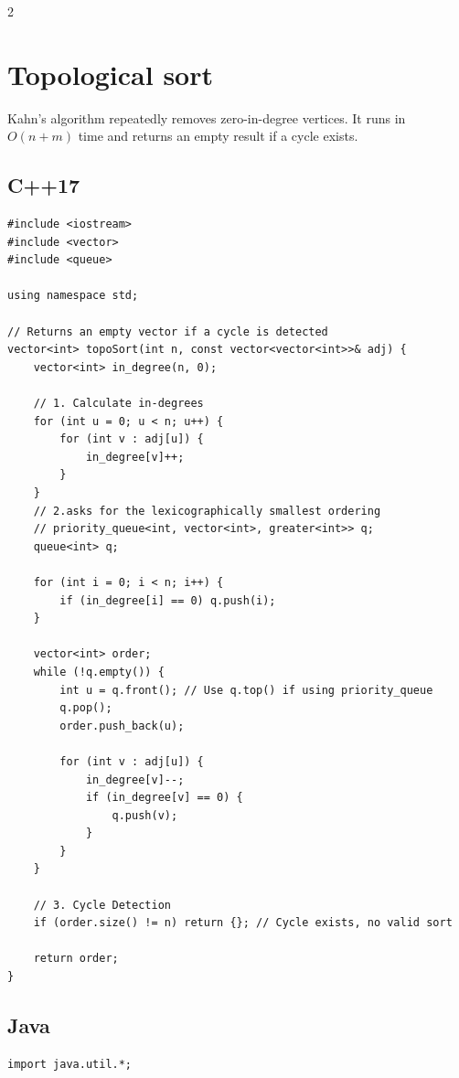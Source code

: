 \documentclass[10pt]{article}
\begin{document}
\newpage
\begin{multicols}{2}

\section{Topological sort}
Kahn's algorithm repeatedly removes zero-in-degree vertices.
It runs in $O(n+m)$ time and returns an empty result if a cycle exists.

\subsection{C++17}
\begin{framed}
\scriptsize
\begin{verbatim}
#include <iostream>
#include <vector>
#include <queue>

using namespace std;

// Returns an empty vector if a cycle is detected
vector<int> topoSort(int n, const vector<vector<int>>& adj) {
    vector<int> in_degree(n, 0);

    // 1. Calculate in-degrees
    for (int u = 0; u < n; u++) {
        for (int v : adj[u]) {
            in_degree[v]++;
        }
    }
    // 2.asks for the lexicographically smallest ordering
    // priority_queue<int, vector<int>, greater<int>> q;
    queue<int> q;

    for (int i = 0; i < n; i++) {
        if (in_degree[i] == 0) q.push(i);
    }

    vector<int> order;
    while (!q.empty()) {
        int u = q.front(); // Use q.top() if using priority_queue
        q.pop();
        order.push_back(u);

        for (int v : adj[u]) {
            in_degree[v]--;
            if (in_degree[v] == 0) {
                q.push(v);
            }
        }
    }

    // 3. Cycle Detection
    if (order.size() != n) return {}; // Cycle exists, no valid sort

    return order;
}
\end{verbatim}
\end{framed}

\subsection{Java}
\begin{framed}
\scriptsize
\begin{verbatim}
import java.util.*;


\end{verbatim}
\end{framed}
\end{multicols}
\end{document}
